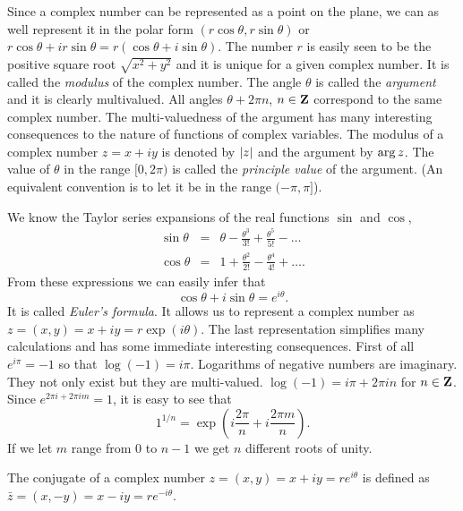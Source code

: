 Since a complex number can be represented as a point on the plane, we can
as well represent it in the polar form $(r\cos\theta, r\sin\theta)$ or
$r\cos\theta + ir\sin\theta = r(\cos\theta + i\sin\theta)$. The number $r$
is easily seen to be the positive square root $\sqrt{x^2 + y^2}$ and it is
unique for a given complex number. It is called the \emph{modulus} of the
complex number. The angle $\theta$ is called the \emph{argument} and it is
clearly multivalued. All angles $\theta + 2\pi n$, $n \in \mathbf{Z}$ correspond to
the same complex number. The multi-valuedness of the argument has many 
interesting consequences to the nature of functions of complex variables. The
modulus of a complex number $z = x + iy$ is denoted by $\left\vert{z}\right\vert$ and the
argument by $\operatorname{arg}{z}$. The value of $\theta$ in the range $[0, 2\pi)$ is called
the \emph{principle value} of the argument. (An equivalent convention is to let
it be in the range $(-\pi, \pi]$).

We know the Taylor series expansions of the real functions $\sin$ and $\cos$,
\begin{eqnarray*}
\sin\theta &=& \theta - \frac{\theta^3}{3!} + \frac{\theta^5}{5!} - \ldots \\
\cos\theta &=& 1 + \frac{\theta^2}{2!} - \frac{\theta^4}{4!} + \ldots.
\end{eqnarray*}
From these expressions we can easily infer that
\begin{equation}\label{c1s2e1}
\cos\theta + i\sin\theta = e^{i\theta}.
\end{equation}
It is called \emph{Euler's formula}. It allows us to represent a complex number
as $z = (x, y) = x + iy = r\exp(i\theta)$. The last representation simplifies
many calculations and has some immediate interesting consequences. First of all
$e^{i\pi} = -1$ so that $\log(-1) = i\pi$. Logarithms of negative numbers are
imaginary. They not only exist but they are multi-valued. $\log(-1) = i\pi + 
2\pi in$ for $n \in \mathbf{Z}$. Since $e^{2\pi i + 2\pi im} = 1$, it is easy to see 
that 
\[
1^{1/n} = \exp\left(i\frac{2\pi}{n} + i\frac{2\pi m}{n}\right).
\]
If we let $m$ range from $0$ to $n - 1$ we get $n$ different roots of unity.

The conjugate of a complex number $z = (x, y) = x + iy = re^{i\theta}$ is
defined as $\bar{z} = (x, -y) = x - iy = re^{-i\theta}$.

